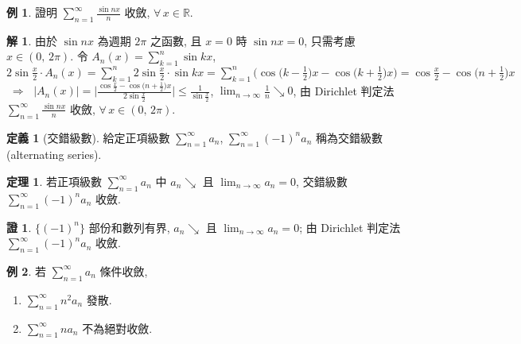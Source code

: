 \documentclass[12pt]{extarticle}
\newcommand{\ds}{\displaystyle}
\newcommand{\ie}{\;\Longrightarrow\;}
\theoremstyle{definition}
\newtheorem*{dfn}{定義}
\newtheorem*{thm}{定理}
\newtheorem*{ex}{例}
\newtheorem*{sol}{解}
\newtheorem*{prf}{證}
\begin{document}
\begin{ex}
  證明 $\ds\sum_{n = 1}^\infty\frac{\sin nx}{n}$ 收斂, $\forall\,x\in\mathbb{R}$. 
\end{ex}

\begin{sol}
  由於 $\sin nx$ 為週期 $2\pi$ 之函數, 且 $\ds x= 0$ 時 $\ds\sin nx = 0$, 只需考慮 $x\in(0,\,2\pi)$. 令 $\ds A_n(x) = \sum_{k = 1}^n\sin k x$, $\ds 2\sin\frac{x}{2}\cdot A_n(x) = \sum_{k = 1}^n 2\sin\frac{x}{2}\cdot\sin k x = \sum_{k = 1}^n\bigg(\cos\Big(k - \frac{1}{2}\Big)x - \cos\Big(k + \frac{1}{2}\Big)x\bigg) = \cos\frac{x}{2} - \cos\Big(n + \frac{1}{2}\Big)x$ $\ie$ $\ds|A_n(x)| = \Bigg|\frac{\cos\frac{x}{2} - \cos\big(n + \frac{1}{2}\big)x}{2\sin\frac{x}{2}}\Bigg|\leqslant\frac{1}{\sin\frac{x}{2}}$, $\ds\lim_{n\to\infty}\frac{1}{n}\searrow 0$, 由 Dirichlet 判定法 $\ds\sum_{n = 1}^\infty\frac{\sin nx}{n}$ 收斂, $\forall\,x\in(0,\,2\pi)$. 
\end{sol}

\begin{dfn}[交錯級數]
  給定正項級數 $\ds\sum_{n = 1}^\infty a_n$, $\ds\sum_{n = 1}^\infty(-1)^n a_n$ 稱為交錯級數 (alternating series).  
\end{dfn}

\begin{thm}
  若正項級數 $\ds\sum_{n = 1}^\infty a_n$ 中 $\ds a_n\searrow$ 且 $\ds\lim_{n\to\infty}a_n = 0$, 交錯級數 $\ds\sum_{n = 1}^\infty(-1)^n a_n$ 收斂.  
\end{thm}

\begin{prf}
  $\{(-1)^n\}$ 部份和數列有界, $\ds a_n\searrow$ 且 $\ds\lim_{n\to\infty}a_n = 0$; 由 Dirichlet 判定法 $\ds\sum_{n = 1}^\infty(-1)^n a_n$ 收斂.  
\end{prf}

\begin{ex} 若 $\ds\sum_{n = 1}^\infty a_n$ 條件收斂, 
  \begin{multicols}{2}
    \begin{enumerate}\setlength{\itemsep}{0pt}
      \item $\ds\sum_{n = 1}^\infty n^2 a_n$ 發散. 
      \item $\ds\sum_{n = 1}^\infty n a_n$ 不為絕對收斂. 
    \end{enumerate}
  \end{multicols}
\end{ex}
\end{document}
